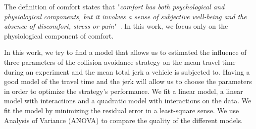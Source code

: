 
The definition of comfort states that "\textit{comfort has both psychological and physiological components, but it involves a sense of subjective well-being and the absence of discomfort, stress or pain}"~\cite{richards_psychology_1980}. In this work, we focus only on the physiological component of comfort. 

In this work, we try to find a model that allows us to estimated the influence of three parameters of the collision avoidance strategy on the mean travel time during an experiment and the mean total jerk a vehicle is subjected to. Having a good model of the travel time and the jerk will allow us to choose the parameters in order to optimize the strategy's performance. We fit a linear model, a linear model with interactions and a quadratic model with interactions on the data. We fit the model by minimizing the residual error in a least-square sense.
We use Analysis of Variance (ANOVA) to compare the quality of the different models.
